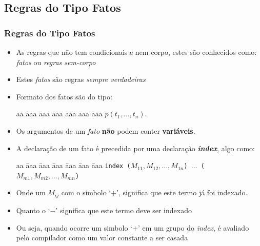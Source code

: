 
\subsection{Regras do Tipo  Fatos}
\begin{frame}[c,allowframebreaks=0.6,fragile]
\frametitle{Regras do Tipo  Fatos}

    \begin{itemize}
        \item As regras que não tem condicionais e nem corpo, estes  são conhecidos
        como:  \textit{fatos} ou \textit{regras sem-corpo}
        
       \item Estes \textit{fatos} são regras \textit{sempre verdadeiras}
        
        \item Formato dos fatos são do tipo:
        
        \begin{tabbing}
          aa \= aaa \= aaa \= aaa \= aaa \= aaa \= aaa \kill
          \> \> $p(t_1,\ldots,t_n)$. 
        \end{tabbing}
        
        \item Os argumentos de um \emph{fato} \textbf{não} podem conter \textbf{variáveis}.
        
        \framebreak
        
        \item A declaração de um fato é precedida por uma declaração \textbf{\emph{index}},
        algo como:
        
        \begin{tabbing}
        aa \= aaa \= aaa \= aaa \= aaa \= aaa \= aaa \kill
            \> \texttt{index ($M_{11},M_{12},\ldots,M_{1n}$) $\ldots$ ($M_{m1},M_{m2},\ldots,M_{mn}$)} 
        \end{tabbing}
        
        \item Onde um $M_{ij}$ com o simbolo `$+$',  significa que este termo já foi 
        indexado.
        
        \item Quanto o `$-$' significa que este termo deve ser indexado
        
        \item Ou seja, quando ocorre um simbolo `$+$' em um grupo do \textit{index}, é avaliado
        pelo compilador como um valor constante a ser casada
        

\end{itemize}
\end{frame}
